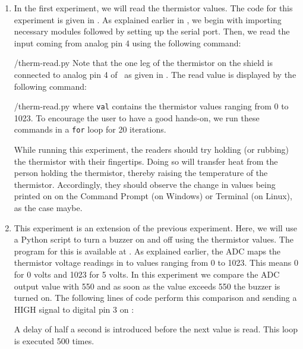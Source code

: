 \begin{enumerate}
  \item In the first experiment, we will read the thermistor values.
        The code for this experiment is given in .
        As explained earlier in , we begin with
        importing necessary modules followed by setting up the serial port.
        Then, we read the input coming from analog pin 4 using the
        following command:
        
        {\LocTHERMpycode/therm-read.py} Note that the one leg of the thermistor on
        the shield is connected to analog pin 4 of \arduino\,
        as given in . The read value is displayed
        by the following command:
        
        {\LocTHERMpycode/therm-read.py} where {\tt val} contains
        the thermistor values ranging from 0 to 1023. To
        encourage the user to have a good hands-on, we run these commands in
        a {\tt for} loop for 20 iterations.

        While running this experiment,
        the readers should try holding (or rubbing) the thermistor with their fingertips.
        Doing so will transfer heat from the person holding the
        thermistor, thereby raising the temperature of the thermistor.
        Accordingly, they should observe the change in values being printed on on the
        Command Prompt (on Windows) or Terminal (on Linux), as the case maybe.


  \item This experiment is an extension of the previous
        experiment. Here, we will use a Python script to
        turn a buzzer on and off using the thermistor values.
        The program for this is available at
        .  As explained earlier,
        the ADC maps the thermistor voltage readings in to values
        ranging from 0 to 1023. This means 0 for 0 volts and 1023 for 5
        volts. In this experiment we compare the ADC output value with 550
        and as soon as the value exceeds 550 the buzzer is turned on. The following lines of code perform this
        comparison and sending a {HIGH} signal to digital pin 3 on \arduino:
        
        A delay of half a second is introduced
        before the next value is read. This loop is executed 500 times.


\end{enumerate}
